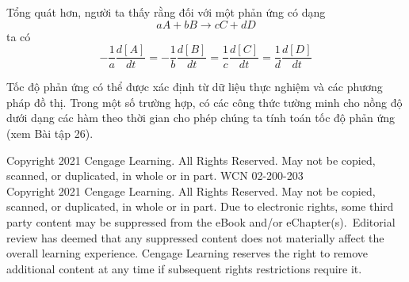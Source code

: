 Tổng quát hơn, người ta thấy rằng đối với một phản ứng có dạng
\begin{equation*}
aA + bB \to cC + dD
\end{equation*}
\noindent
ta có
\begin{equation*}
-\frac{1}{a}\frac{d[A]}{dt} = -\frac{1}{b}\frac{d[B]}{dt} = \frac{1}{c}\frac{d[C]}{dt} = \frac{1}{d}\frac{d[D]}{dt}
\end{equation*}

Tốc độ phản ứng có thể được xác định từ dữ liệu thực nghiệm và các phương pháp đồ thị. Trong một số trường hợp, có các công thức tường minh cho nồng độ dưới dạng các hàm theo thời gian cho phép chúng ta tính toán tốc độ phản ứng (xem Bài tập 26).\hfill\stewartsquare

\vfill
\begin{center}
{\fontsize{5.5}{7}\selectfont\color{black!60}
Copyright 2021 Cengage Learning. All Rights Reserved. May not be copied, scanned, or duplicated, in whole or in part. WCN 02-200-203\\[2pt]
Copyright 2021 Cengage Learning. All Rights Reserved. May not be copied, scanned, or duplicated, in whole or in part. Due to electronic rights, some third party content may be suppressed from the eBook and/or eChapter(s).\
Editorial review has deemed that any suppressed content does not materially affect the overall learning experience. Cengage Learning reserves the right to remove additional content at any time if subsequent rights restrictions require it.
}
\end{center}
